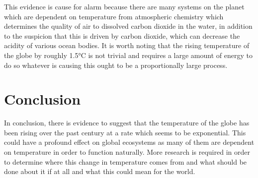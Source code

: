 \documentclass[journal, a4paper]{IEEEtran}
\begin{document}
    This evidence is cause for alarm because there are many systems on the planet which are dependent on temperature from atmospheric chemistry which determines the quality of air to dissolved carbon dioxide in the water, in addition to the suspicion that this is driven by carbon dioxide, which can decrease the acidity of various ocean bodies. It is worth noting that the rising temperature of the globe by roughly 1.5°C is not trivial and requires a large amount of energy to do so whatever is causing this ought to be a proportionally large process.

\newpage

\section{Conclusion}
	In conclusion, there is evidence to suggest that the temperature of the globe has been rising over the past century at a rate which seems to be exponential. This could have a profound effect on global ecosystems as many of them are dependent on temperature in order to function naturally. More research is required in order to determine where this change in temperature comes from and what should be done about it if at all and what this could mean for the world.

\end{document}
